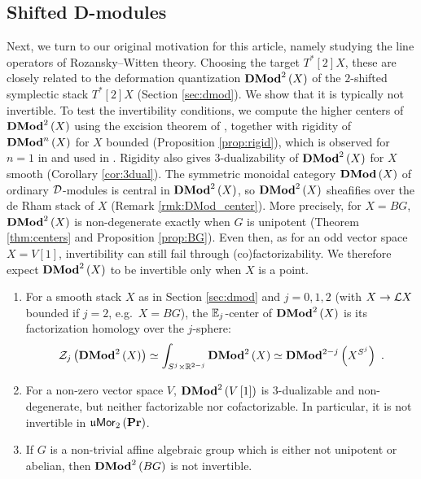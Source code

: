 \subsection*{Shifted D-modules}
Next, we turn to our original motivation for this article, namely studying the line operators of Rozansky--Witten theory.
Choosing the target $T^*\left[2\right]X$, these are closely related to the
deformation quantization $\mathbf{DMod}^2\left(X\right)$ of the $2$-shifted symplectic stack
$T^*\left[2\right]X$ \cite{Ber:Sph, HoLi} (Section \ref{sec:dmod}).
We show that it is typically not invertible.
To test the invertibility conditions, we compute the higher centers of $\mathbf{DMod}^2\left(X\right)$ using the
excision theorem of \cite{HoLi}, together with rigidity of $\mathbf{DMod}^n\left(X\right)$ for $X$ bounded (Proposition \ref{prop:rigid}), which is observed for $n=1$ in
\cite{Ber:center} and used in \cite[Section 5.2]{Ber:Sph}. Rigidity also gives $3$-dualizability of $\mathbf{DMod}^2\left(X\right)$ for $X$
smooth (Corollary \ref{cor:3dual}).
The symmetric monoidal category $\mathbf{DMod}\left(X\right)$ of ordinary $\mathcal{D}$-modules is central in
$\mathbf{DMod}^2\left(X\right)$, so $\mathbf{DMod}^2\left(X\right)$ sheafifies over the de Rham stack of $X$
(Remark \ref{rmk:DMod_center}).
More precisely, for $X=BG$, $\mathbf{DMod}^2\left(X\right)$ is non-degenerate exactly when $G$ is
unipotent (Theorem \ref{thm:centers} and Proposition \ref{prop:BG}). Even then, as for an odd vector
space $X=V\left[1\right]$, invertibility can still fail through (co)factorizability.
We therefore expect $\mathbf{DMod}^2\left(X\right)$ to be invertible only when $X$ is a point.

\begin{introthm}
\label{thm:intro_B}
\leavevmode
\begin{enumerate}
\item For a smooth stack $X$ as in Section \ref{sec:dmod} and $j=0,1,2$ (with $X\to\mathcal{L} X$ bounded if $j=2$, e.g.\ $X=BG$), the $\mathbb{E}_j$-center of $\mathbf{DMod}^2\left(X\right)$ is its
factorization homology over the $j$-sphere:
\begin{equation*}
\mathcal{Z}_j\left(\mathbf{DMod}^2\left(X\right)\right)\simeq\int_{S^j\times\mathbb{R}^{2-j}}\mathbf{DMod}^2\left(X\right)
\simeq\mathbf{DMod}^{2-j}\left(X^{S^j}\right) \ .
\end{equation*}
\item\label{thm:intro_B-example} For a non-zero vector space $V$, $\mathbf{DMod}^2\left(V\left[1\right]\right)$ is $3$-dualizable and
non-degenerate, but neither factorizable nor cofactorizable. In particular, it is not invertible in
$\mathfrak{u}\mathsf{Mor}_2\left(\mathbf{Pr}\right)$.
\item If $G$ is a non-trivial affine algebraic group which is either not unipotent or abelian, then
$\mathbf{DMod}^2\left(BG\right)$ is not invertible.
\end{enumerate}
\end{introthm}

